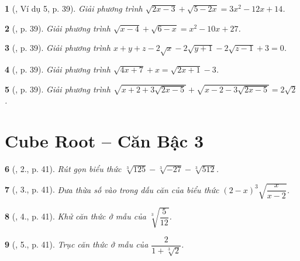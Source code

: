 \documentclass{article}
\newtheorem{baitoan}{}%
\begin{document}
\begin{baitoan}[\cite{Binh_boi_duong_Toan_9_tap_1}, Ví dụ 5, p. 39]
	Giải phương trình $\sqrt{2x - 3} + \sqrt{5 - 2x} = 3x^2 - 12x + 14$.
\end{baitoan}

\begin{baitoan}[\cite{Binh_boi_duong_Toan_9_tap_1}, p. 39]
	Giải phương trình $\sqrt{x - 4} + \sqrt{6 - x} = x^2 - 10x + 27$.
\end{baitoan}

\begin{baitoan}[\cite{Binh_boi_duong_Toan_9_tap_1}, p. 39]
	Giải phương trình $x + y + z - 2\sqrt{x} -2\sqrt{y + 1} - 2\sqrt{z - 1} + 3 = 0$.
\end{baitoan}

\begin{baitoan}[\cite{Binh_boi_duong_Toan_9_tap_1}, p. 39]
	Giải phương trình $\sqrt{4x + 7} + x = \sqrt{2x + 1} - 3$.
\end{baitoan}

\begin{baitoan}[\cite{Binh_boi_duong_Toan_9_tap_1}, p. 39]
	Giải phương trình $\sqrt{x + 2 + 3\sqrt{2x - 5}} + \sqrt{x - 2 - 3\sqrt{2x - 5}} = 2\sqrt{2}$.
\end{baitoan}


\section{Cube Root -- Căn Bậc 3}

\begin{baitoan}[\cite{Binh_boi_duong_Toan_9_tap_1}, 2., p. 41]
	Rút gọn biểu thức $\sqrt[3]{125} - \sqrt[3]{-27} - \sqrt[3]{512}$.
\end{baitoan}

\begin{baitoan}[\cite{Binh_boi_duong_Toan_9_tap_1}, 3., p. 41]
	Đưa thừa số vào trong dấu căn của biểu thức $(2 - x)^3 \sqrt{\dfrac{x}{x - 2}}$.
\end{baitoan}

\begin{baitoan}[\cite{Binh_boi_duong_Toan_9_tap_1}, 4., p. 41]
	Khử căn thức ở mẫu của $\sqrt[3]{\dfrac{5}{12}}$.
\end{baitoan}

\begin{baitoan}[\cite{Binh_boi_duong_Toan_9_tap_1}, 5., p. 41]
	Trục căn thức ở mẫu của $\dfrac{2}{1 + \sqrt[3]{2}}$.
\end{baitoan}
\end{document}
